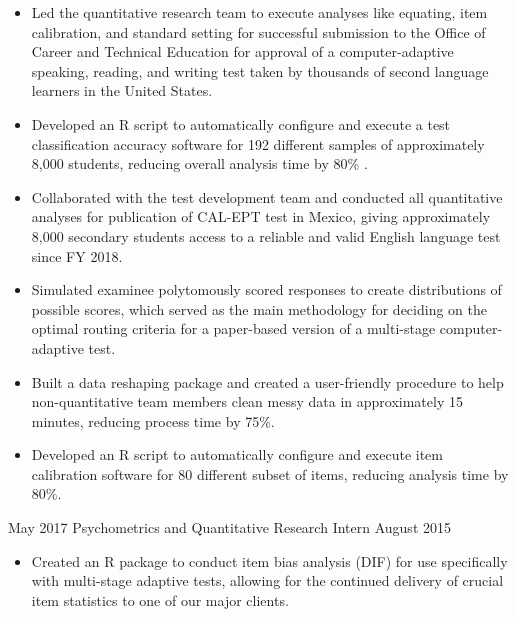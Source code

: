 \begin{experiences}
{\begin{itemize}
            \item Led the quantitative research team to execute analyses like equating, item calibration, and standard setting for successful submission to the Office of Career and Technical Education for approval of a computer-adaptive speaking, reading, and writing test taken by thousands of second language learners in the United States.
      
            \item Developed an R script to automatically configure and execute a test classification accuracy software for 192 different samples of approximately 8,000 students, reducing overall analysis time by 80\% . 

          \item Collaborated with the test development team and conducted all quantitative analyses for publication of CAL-EPT test in Mexico, giving approximately 8,000 secondary students access to a reliable and valid English language test since FY 2018.
          
          \item Simulated examinee polytomously scored responses to create distributions of possible scores, which served as the main methodology for deciding on the optimal routing criteria for a paper-based version of a multi-stage computer-adaptive test. 
          
          \item Built a data reshaping package and created a user-friendly procedure to help non-quantitative team members clean messy data in approximately 15 minutes, reducing process time by 75\%.
          
          \item Developed an R script to automatically configure and execute item calibration software for 80 different subset of items, reducing analysis time by 80\%.
          
      \end{itemize}
      

                    }
    \emptySeparator                
                    
    \experienceADD
    {May 2017}
    {Psychometrics and Quantitative Research Intern}
    {August 2015} {
      \begin{itemize}
            \item Created an R package to conduct item bias analysis (DIF) for use specifically with multi-stage adaptive tests, allowing for the continued delivery of crucial item statistics to one of our major clients.
            

\end{itemize}}
\end{experiences}
